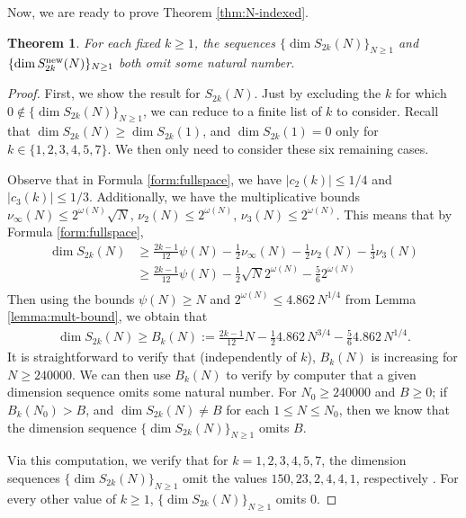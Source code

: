 \documentclass[12pt,letterpaper,reqno]{amsart}
\newtheorem{theorem}{Theorem}[section]
\theoremstyle{definition}
\numberwithin{equation}{section}
\numberwithin{figure}{section}
\numberwithin{table}{section}
\newcommand{\lrabs}[1]{\left\lvert #1 \right\lvert}
\newcommand{\nw}{{\textnormal{new}}}
\begin{document}
Now, we are ready to prove Theorem \ref{thm:N-indexed}.
{
\renewcommand{\thetheorem}{\ref{thm:N-indexed}}
\begin{theorem}
    For each fixed $k \ge 1$, the sequences $\{ \dim S_{2k}(N) \}_{N\ge1}$ and $\{\dim S_{2k}^\nw(N) \}_{N\ge1}$ both omit some natural number.
\end{theorem}
\addtocounter{theorem}{-1}
}
\begin{proof}
    First, we show the result for $S_{2k}(N)$. Just by excluding the $k$ for which $0 \notin \{ \dim S_{2k}(N) \}_{N\ge1}$, we can reduce to a finite list of $k$ to consider. Recall that $\dim S_{2k}(N) \ge \dim S_{2k}(1)$, and $\dim S_{2k}(1) = 0$ only for $k \in \{1,2,3,4,5,7\}$. We then only need to consider these six remaining cases.

    Observe that in Formula \ref{form:fullspace}, we have $\lrabs{c_2(k)} \le 1/4$ and $\lrabs{c_3(k)} \le 1/3$. Additionally, we have the multiplicative bounds $\nu_\infty(N) \le 2^{\omega(N)} \sqrt{N}$, $\nu_2(N) \le 2^{\omega(N)}$, $\nu_3(N) \le 2^{\omega(N)}$.
    This means that by Formula \ref{form:fullspace},
    \begin{align}
        \dim S_{2k}(N) 
        &\ge \frac{2k-1}{12} \psi(N) - \frac12 \nu_\infty(N) - \frac12 \nu_2(N) - \frac13 \nu_3(N) \\
        &\ge \frac{2k-1}{12} \psi(N) - \frac12 \sqrt{N}2^{\omega(N)} - \frac56 2^{\omega(N)} \\ 
    \end{align}
    Then using the bounds $\psi(N) \ge N$ and $2^{\omega(N)} \le 4.862 \, N^{1/4}$ from Lemma \ref{lemma:mult-bound}, we obtain that
    \begin{align}
        \dim S_{2k}(N) \ge B_k(N) := \frac{2k-1}{12} N - \frac12 4.862\, N^{3/4} - \frac56 4.862\,  N^{1/4}.
    \end{align}
    It is straightforward to verify that (independently of $k$), $B_k(N)$ is increasing for $N \ge 240000$. We can then use $B_k(N)$ to verify by computer that a given dimension sequence omits some natural number. For $N_0 \ge 240000$ and $B \ge 0$; if $B_k(N_0) > B$, and $\dim S_{2k}(N) \ne B$ for each $1 \le N \le N_0$, then we know that the dimension sequence $\{ \dim S_{2k}(N) \}_{N\ge1}$ omits $B$.

    Via this computation, we verify that for $k=1,2,3,4,5,7$, the dimension sequences $\{ \dim S_{2k}(N) \}_{N\ge1}$ omit the values $150,23,2,4,4,1$, respectively \cite{ross-code}. For every other value of $k \ge 1$, $\{ \dim S_{2k}(N) \}_{N\ge1}$ omits $0$.


\end{proof}
\end{document}
